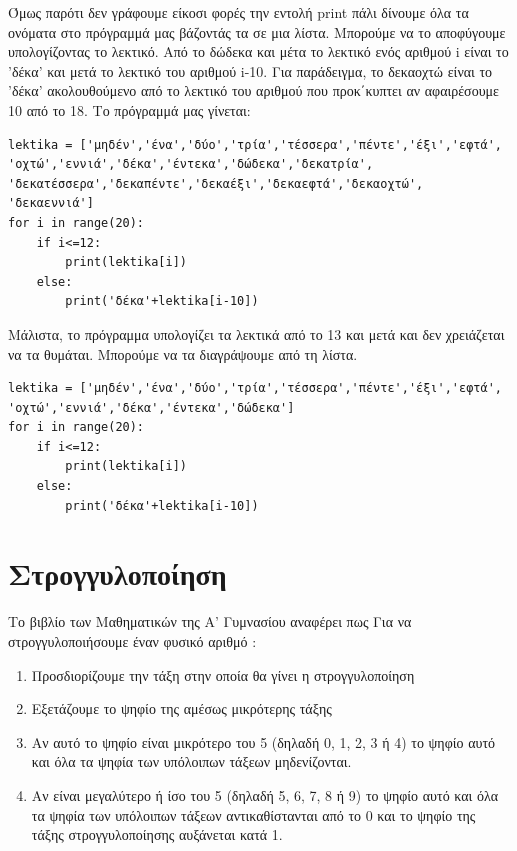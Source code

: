 Όμως παρότι δεν γράφουμε είκοσι φορές την εντολή print πάλι δίνουμε όλα τα ονόματα στο πρόγραμμά μας βάζοντάς τα σε μια λίστα. Μπορούμε να το αποφύγουμε υπολογίζοντας το λεκτικό. Από το δώδεκα και μέτα το λεκτικό ενός αριθμού i είναι το 'δέκα' και μετά το λεκτικό του αριθμού i-10. Για παράδειγμα, το δεκαοχτώ είναι το 'δέκα' ακολουθούμενο από το λεκτικό του αριθμού που προκ΄κυπτει αν αφαιρέσουμε 10 από το 18.
Το πρόγραμμά μας γίνεται:
\begin{lstlisting}
lektika = ['μηδέν','ένα','δύο','τρία','τέσσερα','πέντε','έξι','εφτά',
'οχτώ','εννιά','δέκα','έντεκα','δώδεκα','δεκατρία',
'δεκατέσσερα','δεκαπέντε','δεκαέξι','δεκαεφτά','δεκαοχτώ',
'δεκαεννιά']
for i in range(20):
    if i<=12:
        print(lektika[i])
    else:
        print('δέκα'+lektika[i-10])
\end{lstlisting}

Μάλιστα, το πρόγραμμα υπολογίζει τα λεκτικά από το 13 και μετά και δεν χρειάζεται να τα θυμάται. Μπορούμε να τα διαγράψουμε από τη λίστα.
\begin{lstlisting}
lektika = ['μηδέν','ένα','δύο','τρία','τέσσερα','πέντε','έξι','εφτά',
'οχτώ','εννιά','δέκα','έντεκα','δώδεκα']
for i in range(20):
    if i<=12:
        print(lektika[i])
    else:
        print('δέκα'+lektika[i-10])
\end{lstlisting}



\section{Στρογγυλοποίηση}
Το βιβλίο των Μαθηματικών της Α' Γυμνασίου αναφέρει πως
Για να στρογγυλοποιήσουμε έναν φυσικό αριθμό :
\begin{enumerate}
	\item Προσδιορίζουμε την τάξη στην οποία θα γίνει η στρογγυλοποίηση
	\item Εξετάζουμε το ψηφίο της αμέσως μικρότερης τάξης
	\item Αν αυτό το ψηφίο είναι μικρότερο του 5 (δηλαδή 0, 1, 2, 3 ή 4) το ψηφίο αυτό και όλα τα ψηφία των υπόλοιπων τάξεων μηδενίζονται.
	\item Αν είναι μεγαλύτερο ή ίσο του 5 (δηλαδή 5, 6, 7, 8 ή 9) το ψηφίο αυτό και όλα τα ψηφία των υπόλοιπων τάξεων αντικαθίστανται από το 0 και το ψηφίο της τάξης στρογγυλοποίησης αυξάνεται κατά 1.
\end{enumerate}


